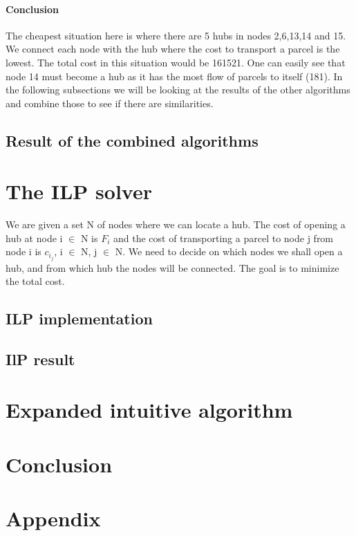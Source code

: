 \documentclass{article}
\begin{document}
\paragraph{Conclusion}
The cheapest situation here is where there are 5 hubs in nodes 2,6,13,14 and 15. We connect each node with the hub where the cost to transport a parcel is the lowest. The total cost in this situation would be 161521. One can easily see that node 14 must become a hub as it has the most flow of parcels to itself (181). In the following subsections we will be looking at the results of the other algorithms and combine those to see if there are similarities.
    

    
    
    \subsection{Result of the combined algorithms}

 
\newpage  
\section{The ILP solver}
We are given a set N of nodes where we can locate a hub. The cost of opening a hub at node i $\in$ N is $F_i$ and the cost of transporting a parcel to node j from node i is $c_{i_j}$, i $\in$ N, j $\in$ N. We need to decide on which nodes we shall open a hub, and from which hub the nodes will be connected. The goal is to minimize the total cost. 
    \subsection{ILP implementation}
    \subsection{IlP result}

\newpage
\section{Expanded intuitive algorithm}


\newpage
\section{Conclusion}


\section{Appendix} 
\end{document}
